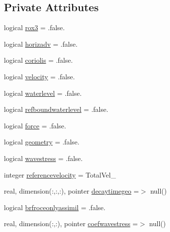 \subsection*{Private Attributes}
\begin{DoxyCompactItemize}
\item 
logical \mbox{\hyperlink{structmodulehydrodynamic_1_1t__relaxation_a3826d5064ce646276a86b3dfee37516a}{rox3}} = .false.
\item 
logical \mbox{\hyperlink{structmodulehydrodynamic_1_1t__relaxation_a2f62c22be9914a7ecc2a7ce48c3ab627}{horizadv}} = .false.
\item 
logical \mbox{\hyperlink{structmodulehydrodynamic_1_1t__relaxation_a8891d8712473edc8ca6644aec68c804c}{coriolis}} = .false.
\item 
logical \mbox{\hyperlink{structmodulehydrodynamic_1_1t__relaxation_aec339ea7399d14beef5342d9a98194e8}{velocity}} = .false.
\item 
logical \mbox{\hyperlink{structmodulehydrodynamic_1_1t__relaxation_aad961a7e50f0a344ac7e632a755eeba0}{waterlevel}} = .false.
\item 
logical \mbox{\hyperlink{structmodulehydrodynamic_1_1t__relaxation_a11a50fec8060fcb9b261854823a64874}{refboundwaterlevel}} = .false.
\item 
logical \mbox{\hyperlink{structmodulehydrodynamic_1_1t__relaxation_a55578f30547f1105c29597fd13b633d5}{force}} = .false.
\item 
logical \mbox{\hyperlink{structmodulehydrodynamic_1_1t__relaxation_aec3d52ae8307744f1a98b941acdc0c9c}{geometry}} = .false.
\item 
logical \mbox{\hyperlink{structmodulehydrodynamic_1_1t__relaxation_a9b5bff18008baa5b37d3680aaa452202}{wavestress}} = .false.
\item 
integer \mbox{\hyperlink{structmodulehydrodynamic_1_1t__relaxation_a18ba63cffe7c76caf983fb5d75c4a003}{referencevelocity}} = Total\+Vel\+\_\+
\item 
real, dimension(\+:,\+:,\+:), pointer \mbox{\hyperlink{structmodulehydrodynamic_1_1t__relaxation_a290573b44f6a36e919358033847632f6}{decaytimegeo}} =$>$ null()
\item 
logical \mbox{\hyperlink{structmodulehydrodynamic_1_1t__relaxation_a2a81ca872c88c1d2b11832ba43c12ca2}{brfroceonlyassimil}} = .false.
\item 
real, dimension(\+:,\+:), pointer \mbox{\hyperlink{structmodulehydrodynamic_1_1t__relaxation_a76234a3ddee5ed66ae7756ab40476b18}{coefwavestress}} =$>$ null()
\end{DoxyCompactItemize}


